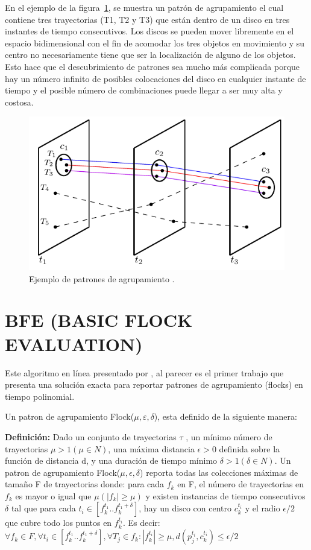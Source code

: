 En el ejemplo de la figura~\ref{fig:flockexample}, se muestra un patrón de 
agrupamiento el cual contiene tres 
trayectorias (T1, T2 y T3)
que están dentro de un disco en tres instantes de tiempo consecutivos. Los 
discos se pueden
mover libremente en el espacio bidimensional con el fin de acomodar los tres 
objetos en movimiento  y su centro no necesariamente
tiene que ser la localización de alguno de los objetos. Esto hace que el
descubrimiento de patrones sea mucho más complicada  porque hay un número 
infinito de posibles
colocaciones del disco en cualquier instante de tiempo y el posible número de 
combinaciones puede llegar a ser muy alta y costosa.

\begin{figure}
  \centering
  \includegraphics[scale=0.8]{pictures/flock_example.pdf}
  \caption{Ejemplo de patrones de agrupamiento \cite{vieira2009line}.}
  \label{fig:flockexample}
\end{figure}


\section{BFE (BASIC FLOCK EVALUATION)}

Este algoritmo en línea presentado por \cite{VieiraT13}, al parecer es el primer trabajo que 
presenta una solución exacta para reportar patrones de agrupamiento (flocks) en tiempo polinomial.

Un patron de agrupamiento Flock($\mu, \varepsilon, \delta$), esta definido de la siguiente manera:


\textbf{Definición:}  Dado un conjunto de trayectorias $\tau$ , un mínimo número de trayectorias 
$\mu >1 (\mu \in N)$, una máxima distancia $\epsilon > 0$ definida sobre la función de distancia d, 
y una duración de tiempo mínimo $\delta > 1 (\delta \in N)$. Un patron de agrupamiento
Flock($\mu, \epsilon, \delta$) reporta todas las colecciones máximas de tamaño F de 
trayectorias donde: para cada $f_{k}$ en F, el número de trayectorias en 
$f_{k}$ es mayor o igual que $\mu (|f_{k} | \geq \mu)$ y existen instancias de tiempo consecutivos 
$\delta$ 
tal que para cada $t_{i} \in [f_{k}^{t_{1}} ..f_{k}^{t_{1} + \delta} ]$,
hay un disco con centro $c_{k}^{t_{i}}$ y el radio $\epsilon / 2$ que cubre todo 
los puntos en $f_{k}^{t_{i}}$. Es decir: 
$\forall f_{k} \in F, \forall t_{i} \in [f_{k}^{t_{1}} ..f_{k}^{t_{1} + \delta}], \forall T_{j} \in 
f_{k}:  |f_{k}^{t_{i}}| \geq \mu, d(p_{j}^{t_{i}}, c_{k}^{t_{i}}) \leq \epsilon /2$

